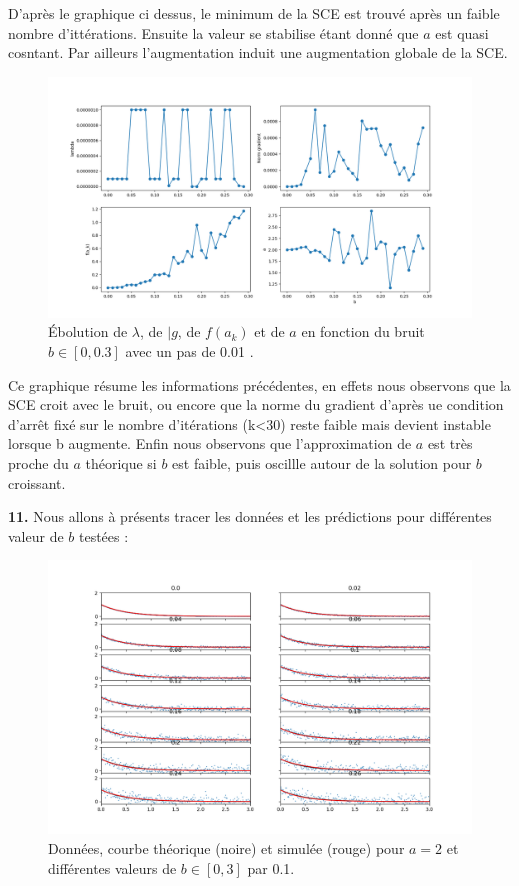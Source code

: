 \documentclass[12pt]{article}
\begin{document}
D'après le graphique ci dessus, le minimum de la SCE est trouvé après un faible nombre d'ittérations. Ensuite la valeur se stabilise étant donné que $a$ est quasi cosntant. Par ailleurs l'augmentation induit une augmentation globale de la SCE.

\begin{figure}[H]
\centering
\includegraphics[width=1\textwidth]{Q10_E.png}
\caption{ Ébolution de $\lambda$, de $|g$, de $f(a_k)$ et de $a$ en fonction du bruit $b \in [0,0.3]$ avec un pas de 0.01 .}
\label{FigQ10B01}
\end{figure}
Ce graphique résume les informations précédentes, en effets nous observons que la SCE croit avec le bruit, ou encore que la norme du gradient d'après ue condition d'arrêt fixé sur le nombre d'itérations (k<30) reste faible mais devient instable lorsque b augmente. Enfin nous observons que l'approximation de $a$ est très proche du $a$ théorique si $b$ est faible, puis oscillle autour de la solution pour $b$ croissant.


\textbf{\color{brick}11.} Nous allons à présents tracer les données et les prédictions pour différentes valeur de $b$ testées :

\begin{figure}[H]
\centering
\includegraphics[width=1\textwidth]{Q111.png}
\caption{Données, courbe théorique (noire) et simulée (rouge) pour $a=2$ et différentes valeurs de $b  \in [0,3]$ par 0.1.}
\label{FigQ111}
\end{figure}
\end{document}
